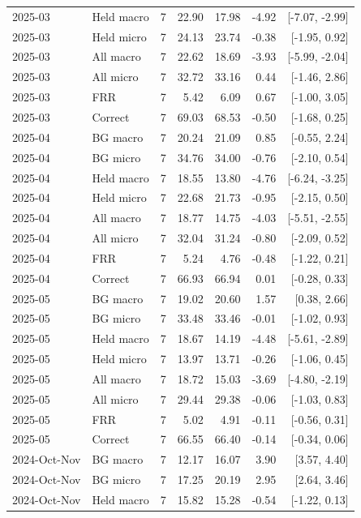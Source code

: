 \begin{longtable}{llrrrrr}
2025-03 & Held macro & 7 & 22.90 & 17.98 & -4.92 & [-7.07, -2.99]\\
2025-03 & Held micro & 7 & 24.13 & 23.74 & -0.38 & [-1.95, 0.92]\\
2025-03 & All macro & 7 & 22.62 & 18.69 & -3.93 & [-5.99, -2.04]\\
2025-03 & All micro & 7 & 32.72 & 33.16 & 0.44 & [-1.46, 2.86]\\
2025-03 & FRR & 7 & 5.42 & 6.09 & 0.67 & [-1.00, 3.05]\\
2025-03 & Correct & 7 & 69.03 & 68.53 & -0.50 & [-1.68, 0.25]\\
2025-04 & BG macro & 7 & 20.24 & 21.09 & 0.85 & [-0.55, 2.24]\\
2025-04 & BG micro & 7 & 34.76 & 34.00 & -0.76 & [-2.10, 0.54]\\
2025-04 & Held macro & 7 & 18.55 & 13.80 & -4.76 & [-6.24, -3.25]\\
2025-04 & Held micro & 7 & 22.68 & 21.73 & -0.95 & [-2.15, 0.50]\\
2025-04 & All macro & 7 & 18.77 & 14.75 & -4.03 & [-5.51, -2.55]\\
2025-04 & All micro & 7 & 32.04 & 31.24 & -0.80 & [-2.09, 0.52]\\
2025-04 & FRR & 7 & 5.24 & 4.76 & -0.48 & [-1.22, 0.21]\\
2025-04 & Correct & 7 & 66.93 & 66.94 & 0.01 & [-0.28, 0.33]\\
2025-05 & BG macro & 7 & 19.02 & 20.60 & 1.57 & [0.38, 2.66]\\
2025-05 & BG micro & 7 & 33.48 & 33.46 & -0.01 & [-1.02, 0.93]\\
2025-05 & Held macro & 7 & 18.67 & 14.19 & -4.48 & [-5.61, -2.89]\\
2025-05 & Held micro & 7 & 13.97 & 13.71 & -0.26 & [-1.06, 0.45]\\
2025-05 & All macro & 7 & 18.72 & 15.03 & -3.69 & [-4.80, -2.19]\\
2025-05 & All micro & 7 & 29.44 & 29.38 & -0.06 & [-1.03, 0.83]\\
2025-05 & FRR & 7 & 5.02 & 4.91 & -0.11 & [-0.56, 0.31]\\
2025-05 & Correct & 7 & 66.55 & 66.40 & -0.14 & [-0.34, 0.06]\\
2024-Oct-Nov & BG macro & 7 & 12.17 & 16.07 & 3.90 & [3.57, 4.40]\\
2024-Oct-Nov & BG micro & 7 & 17.25 & 20.19 & 2.95 & [2.64, 3.46]\\
2024-Oct-Nov & Held macro & 7 & 15.82 & 15.28 & -0.54 & [-1.22, 0.13]\\

\end{longtable}
